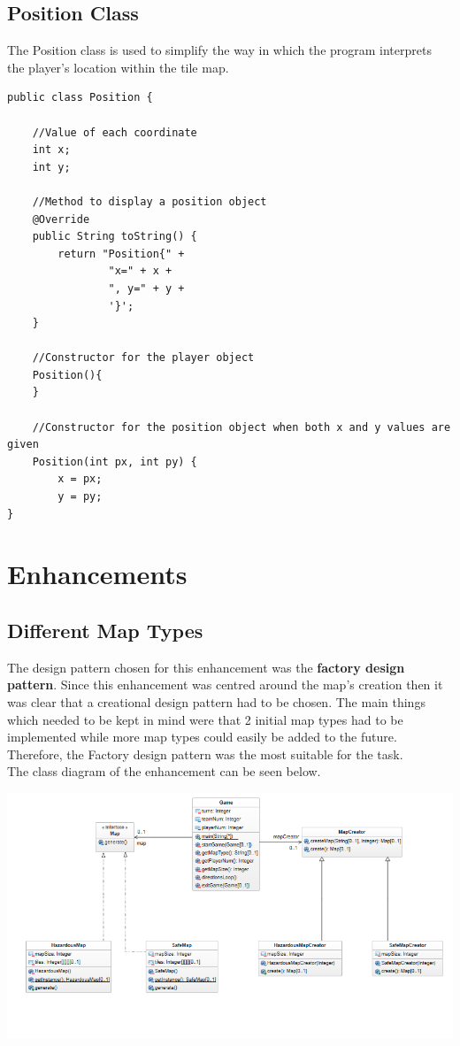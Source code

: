 \documentclass[a4paper,12pt]{extarticle}
\begin{document}
\subsection{Position Class}

The Position class is used to simplify the way in which the program interprets the player's location within the tile map.

\begin{lstlisting}[caption=The initial code of the Position class]
public class Position {

    //Value of each coordinate
    int x;
    int y;

    //Method to display a position object
    @Override
    public String toString() {
        return "Position{" +
                "x=" + x +
                ", y=" + y +
                '}';
    }

    //Constructor for the player object
    Position(){
    }

    //Constructor for the position object when both x and y values are given
    Position(int px, int py) {
        x = px;
        y = py;
}
\end{lstlisting}

\newpage
\section{Enhancements}
\subsection{Different Map Types}

The design pattern chosen for this enhancement was the \textbf{factory design pattern}. Since this enhancement was centred around the map's creation then it was clear that a creational design pattern had to be chosen. The main things which needed to be kept in mind were that 2 initial map types had to be implemented while more map types could easily be added to the future. Therefore, the Factory design pattern was the most suitable for the task.\\

The class diagram of the enhancement can be seen below.\\

\begin{center}
\includegraphics[width=\textwidth]{Enhancement1CD.png}\\
\end{center}
\end{document}
